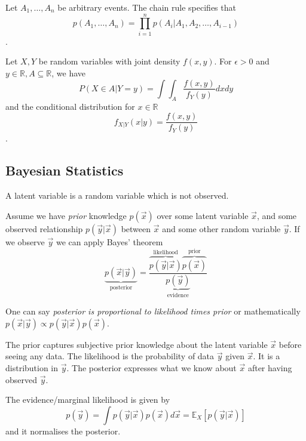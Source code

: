 Let $A_1, \dotsc, A_n$ be arbitrary events.
The chain rule specifies that
\begin{equation*}
    p(A_1, \dotsc, A_n)
    = \prod_{i=1}^n{p(A_i | A_1, A_2, \dotsc, A_{i - 1})}
\end{equation*}.

Let $X, Y$ be random variables with joint density $f(x, y)$.
For $\epsilon > 0$ and $y \in \mathbb{R}, A \subseteq \mathbb{R}$, we have
\begin{equation*}
    P(X \in A | Y = y) = \int{\int_A{\frac{f(x, y)}{f_Y(y)}dx}dy}
\end{equation*}
and the conditional distribution for $x \in \mathbb{R}$
\begin{equation*}
    f_{X | Y}(x | y) = \frac{f(x, y)}{f_Y(y)}
\end{equation*}.


\subsection{Bayesian Statistics}
A latent variable is a random variable which is not observed.

Assume we have \emph{prior} knowledge $p(\vec{x})$
over some latent variable $\vec{x}$,
and some observed relationship $p(\vec{y} | \vec{x})$ between
$\vec{x}$ and some other random variable $\vec{y}$.
If we observe $\vec{y}$ we can apply Bayes' theorem
\begin{equation*}
    \underbrace{p(\vec{x} | \vec{y})}_\text{posterior} = \frac{
        \overbrace{p(\vec{y} | \vec{x})}^\text{likelihood}
        \overbrace{p(\vec{x})}^\text{prior}
    }{
        \underbrace{p(\vec{y})}_\text{evidence}
    }
\end{equation*}

One can say
\emph{posterior is proportional to likelihood times prior} or
mathematically $p(\vec{x} | \vec{y}) \propto p(\vec{y} | \vec{x}) p(\vec{x})$.

The prior captures subjective prior knowledge about the latent
variable $\vec{x}$ before seeing any data.
The likelihood is the probability of data $\vec{y}$ given
$\vec{x}$. It is a distribution in $\vec{y}$.
The posterior expresses what we know about $\vec{x}$ after
having observed $\vec{y}$.

The evidence/marginal likelihood is given by
\begin{equation*}
    p(\vec{y})
    = \int{p(\vec{y} | \vec{x}) p(\vec{x}) d\vec{x}}
    = \mathbb{E}_X[p(\vec{y} | \vec{x})]
\end{equation*}
and it normalises the posterior.


